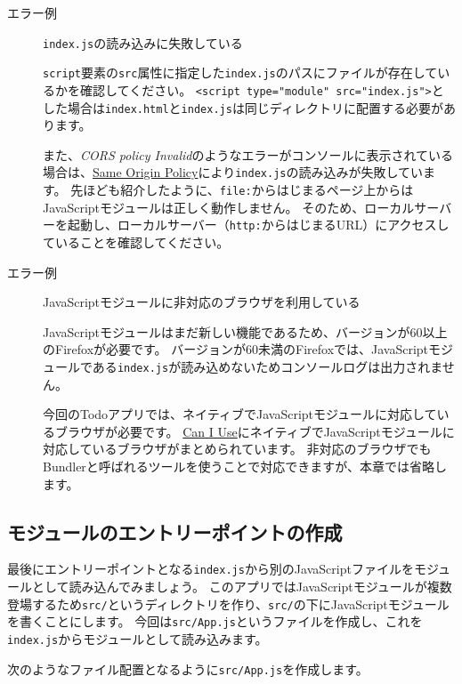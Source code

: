 \begin{description}
\item[エラー例] \texttt{index.js}の読み込みに失敗している

\texttt{script}要素の\texttt{src}属性に指定した\texttt{index.js}のパスにファイルが存在しているかを確認してください。
\texttt{<script type="module" src="index.js">}とした場合は\texttt{index.html}と\texttt{index.js}は同じディレクトリに配置する必要があります。

また、\emph{CORS policy
Invalid}のようなエラーがコンソールに表示されている場合は、\href{https://developer.mozilla.org/ja/docs/Web/Security/Same-origin_policy}{Same
Origin
Policy}により\texttt{index.js}の読み込みが失敗しています。
先ほども紹介したように、\texttt{file:}からはじまるページ上からはJavaScriptモジュールは正しく動作しません。
そのため、ローカルサーバーを起動し、ローカルサーバー（\texttt{http:}からはじまるURL）にアクセスしていることを確認してください。

\item[エラー例] JavaScriptモジュールに非対応のブラウザを利用している

JavaScriptモジュールはまだ新しい機能であるため、バージョンが60以上のFirefoxが必要です。
バージョンが60未満のFirefoxでは、JavaScriptモジュールである\texttt{index.js}が読み込めないためコンソールログは出力されません。

今回のTodoアプリでは、ネイティブでJavaScriptモジュールに対応しているブラウザが必要です。
\href{https://caniuse.com/\#feat=es6-module}{Can I
Use}にネイティブでJavaScriptモジュールに対応しているブラウザがまとめられています。
非対応のブラウザでもBundlerと呼ばれるツールを使うことで対応できますが、本章では省略します。
\end{description}

\hypertarget{module-entry-point}{%
\subsection{モジュールのエントリーポイントの作成}\label{module-entry-point}}

最後にエントリーポイントとなる\texttt{index.js}から別のJavaScriptファイルをモジュールとして読み込んでみましょう。
このアプリではJavaScriptモジュールが複数登場するため\texttt{src/}というディレクトリを作り、\texttt{src/}の下にJavaScriptモジュールを書くことにします。
今回は\texttt{src/App.js}というファイルを作成し、これを\texttt{index.js}からモジュールとして読み込みます。

次のようなファイル配置となるように\texttt{src/App.js}を作成します。

